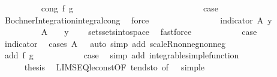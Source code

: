 \begin{isabellebody}
\ \ \ \ \ \ \ \ \isamarkupfalse%
\ {\isacharparenleft}{\kern0pt}cong\ f\ g{\isacharparenright}{\kern0pt}\ \ \ \ \ \ \ \ \ \ \ \ \ \ \ \ \ \ \ \isanewline
\ \ \ \ \ \ \ \ \isamarkupfalse%
\ \isamarkupfalse%
\ {\isacharquery}{\kern0pt}case\ \isamarkupfalse%
\ Bochner{\isacharunderscore}{\kern0pt}Integration{\isachardot}{\kern0pt}integral{\isacharunderscore}{\kern0pt}cong\ \isamarkupfalse%
\ force\isanewline
\ \ \ \ \ \ \isamarkupfalse%
\isanewline
\ \ \ \ \ \ \ \ \isamarkupfalse%
\ {\isacharparenleft}{\kern0pt}indicator\ A\ y{\isacharparenright}{\kern0pt}\isanewline
\ \ \ \ \ \ \ \ \isamarkupfalse%
\ {\isachardoublequoteopen}A\ {\isasymnoteq}\ {\isacharbraceleft}{\kern0pt}{\isacharbraceright}{\kern0pt}\ {\isasymLongrightarrow}\ y\ {\isasymge}\ {}{\isachardoublequoteclose}\ \isamarkupfalse%
\ sets{\isachardot}{\kern0pt}sets{\isacharunderscore}{\kern0pt}into{\isacharunderscore}{\kern0pt}space\ \isamarkupfalse%
\ fastforce\isanewline
\ \ \ \ \ \ \ \ \isamarkupfalse%
\ \isamarkupfalse%
\ {\isacharquery}{\kern0pt}case\ \isamarkupfalse%
\ indicator\ \isamarkupfalse%
\ {\isacharparenleft}{\kern0pt}cases\ {\isachardoublequoteopen}A\ {\isacharequal}{\kern0pt}\ {\isacharbraceleft}{\kern0pt}{\isacharbraceright}{\kern0pt}{\isachardoublequoteclose}{\isacharcomma}{\kern0pt}\ auto\ simp\ add{\isacharcolon}{\kern0pt}\ scaleR{\isacharunderscore}{\kern0pt}nonneg{\isacharunderscore}{\kern0pt}nonneg{\isacharparenright}{\kern0pt}\isanewline
\ \ \ \ \ \ \isamarkupfalse%
\isanewline
\ \ \ \ \ \ \ \ \isamarkupfalse%
\ {\isacharparenleft}{\kern0pt}add\ f\ g{\isacharparenright}{\kern0pt}\isanewline
\ \ \ \ \ \ \ \ \isamarkupfalse%
\ \isamarkupfalse%
\ {\isacharquery}{\kern0pt}case\ \isamarkupfalse%
\ {\isacharparenleft}{\kern0pt}simp\ add{\isacharcolon}{\kern0pt}\ integrable{\isacharunderscore}{\kern0pt}simple{\isacharunderscore}{\kern0pt}function{\isacharparenright}{\kern0pt}\isanewline
\ \ \ \ \ \ \isamarkupfalse%
\isanewline
\ \ \ \ \isacommand{{\isacharbraceright}{\kern0pt}}\isamarkupfalse%
\isanewline
\ \ \ \ \isamarkupfalse%
\ {\isacharquery}{\kern0pt}thesis\ \isamarkupfalse%
\ LIMSEQ{\isacharunderscore}{\kern0pt}le{\isacharunderscore}{\kern0pt}const{\isacharbrackleft}{\kern0pt}OF\ tendsto{\isacharcomma}{\kern0pt}\ of\ {}{\isacharbrackright}{\kern0pt}\ {\isacharasterisk}{\kern0pt}{\isacharasterisk}{\kern0pt}\ simple\ \isamarkupfalse%

\end{isabellebody}
